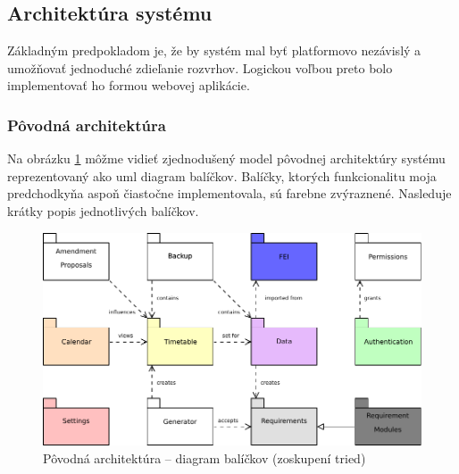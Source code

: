 \subsection{Architektúra systému}
\label{subsec:architecture}

Základným predpokladom je, že by systém mal byť platformovo nezávislý a
umožňovať jednoduché zdieľanie rozvrhov. Logickou voľbou preto bolo
implementovať ho formou webovej aplikácie.

\subsubsection{Pôvodná architektúra}
\label{subsubsec:legacy_arch}

Na obrázku \ref{fig:pkg_diagram} môžme vidieť zjednodušený model pôvodnej
architektúry systému reprezentovaný ako \acrshort{uml} diagram balíčkov.
Balíčky, ktorých funkcionalitu moja predchodkyňa aspoň čiastočne implementovala,
sú farebne zvýraznené. Nasleduje krátky popis jednotlivých balíčkov. \\

\begin{figure}[ht]
  \centering
  \includegraphics{figures/package_diagram.pdf}
  \caption{\label{fig:pkg_diagram} Pôvodná architektúra -- diagram balíčkov
    (zoskupení tried) \cite{knap}}
\end{figure}

